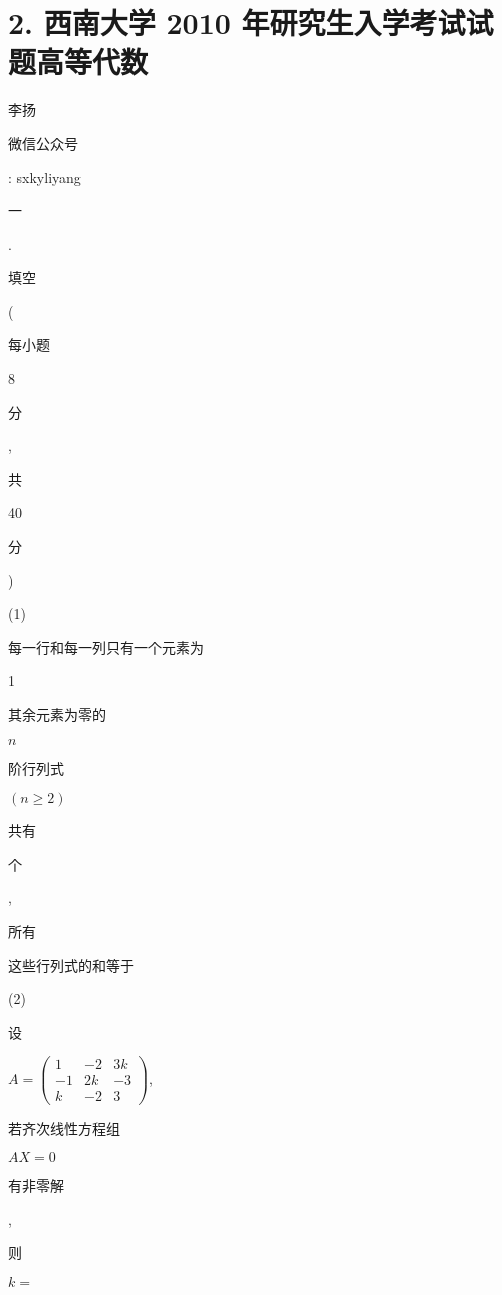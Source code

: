 \documentclass[10pt]{article}
\begin{document}
\section{2. 西南大学 2010 年研究生入学考试试题高等代数}
\begin{CJK}{UTF8}{mj}李扬\end{CJK}

\begin{CJK}{UTF8}{mj}微信公众号\end{CJK}: sxkyliyang

\begin{CJK}{UTF8}{mj}一\end{CJK}. \begin{CJK}{UTF8}{mj}填空\end{CJK}(\begin{CJK}{UTF8}{mj}每小题\end{CJK} 8 \begin{CJK}{UTF8}{mj}分\end{CJK}, \begin{CJK}{UTF8}{mj}共\end{CJK} 40 \begin{CJK}{UTF8}{mj}分\end{CJK})

(1) \begin{CJK}{UTF8}{mj}每一行和每一列只有一个元素为\end{CJK} 1 \begin{CJK}{UTF8}{mj}其余元素为零的\end{CJK} $n$ \begin{CJK}{UTF8}{mj}阶行列式\end{CJK} $(n \geqslant 2)$ \begin{CJK}{UTF8}{mj}共有\end{CJK} \begin{CJK}{UTF8}{mj}个\end{CJK}, \begin{CJK}{UTF8}{mj}所有\end{CJK} \begin{CJK}{UTF8}{mj}这些行列式的和等于\end{CJK}

(2) \begin{CJK}{UTF8}{mj}设\end{CJK} $A=\left(\begin{array}{ccc}1 & -2 & 3 k \\ -1 & 2 k & -3 \\ k & -2 & 3\end{array}\right)$, \begin{CJK}{UTF8}{mj}若齐次线性方程组\end{CJK} $A X=0$ \begin{CJK}{UTF8}{mj}有非零解\end{CJK}, \begin{CJK}{UTF8}{mj}则\end{CJK} $k=$
\end{document}
